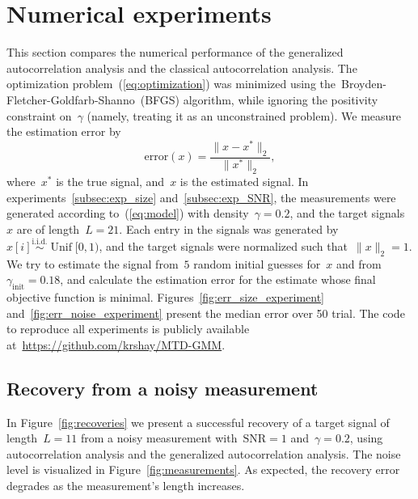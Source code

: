 \documentclass{article}
\DeclareMathOperator{\Unif}{Unif}
\begin{document}
\section{Numerical experiments}
\label{sec:numerical}
This section compares the numerical performance of the generalized autocorrelation analysis and the classical autocorrelation analysis. The optimization problem~(\ref{eq:optimization}) was minimized using the~\mbox{Broyden-Fletcher-Goldfarb-Shanno}~(BFGS) algorithm, while ignoring the positivity constraint on~$\gamma$ (namely, treating it as an unconstrained problem).  We measure the estimation error by
\begin{equation*}
\text{error}(x) = \frac{\|x - x^*\|_2}{\|x^*\|_2},
\end{equation*}
where~$x^*$ is the true signal, and~$x$ is the estimated signal. In experiments~\ref{subsec:exp_size} and~\ref{subsec:exp_SNR}, the measurements were generated according to~(\ref{eq:model}) with density~\mbox{$\gamma = 0.2$}, and the target signals~$x$ are of length~\mbox{$L = 21$}. Each entry in the signals was generated by~$x[i] \overset{\text{i.i.d.}}{\sim} \Unif[0, 1)$, and the target signals were normalized such that~$\|x\|_2  =1$. We try to estimate the signal from~$5$ random initial guesses for~$x$ and from~$\gamma_{\text{init}} = 0.18$, and calculate the estimation error for the estimate whose final objective function is minimal. Figures~\ref{fig:err_size_experiment} and~\ref{fig:err_noise_experiment} present the median error over 50 trial. The code to reproduce all experiments is publicly available at~\url{https://github.com/krshay/MTD-GMM}.

\subsection{Recovery from a noisy measurement}
\label{subsec:exp_recovery}
In Figure~\ref{fig:recoveries} we present a successful recovery of a target signal of length~\mbox{$L = 11$} from a noisy measurement with~\mbox{$\text{SNR} = 1$} and~\mbox{$\gamma = 0.2$}, using autocorrelation analysis and the generalized autocorrelation analysis. The noise level is visualized in Figure~\ref{fig:measurements}. As expected, the recovery error degrades as the measurement's length increases.
\end{document}
